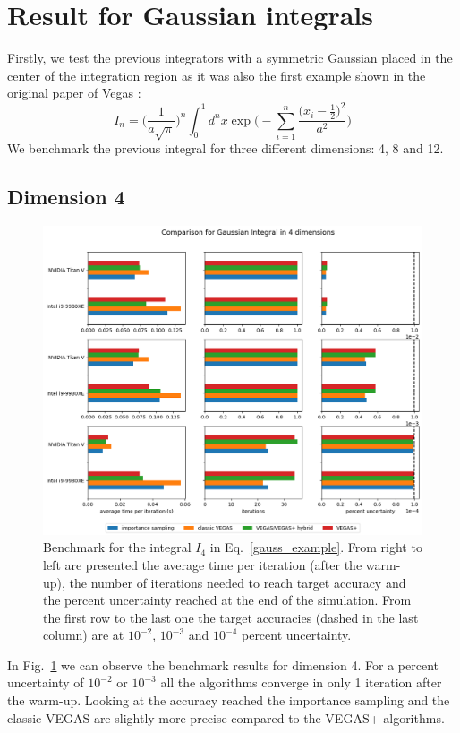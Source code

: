 \documentclass[../main/main.tex]{subfiles}
\begin{document}
\section{Result for Gaussian integrals}
Firstly, we test the previous integrators with a symmetric Gaussian placed in the center of the integration region as it was also the first 
example shown in the original paper of Vegas \cite{Lepage:1977sw}:
\begin{equation}
	\label{gauss_example}
	I_n = \bigg(\frac{1}{a \sqrt{\pi}}\bigg)^n \int_0^1 d^n x\exp{\bigg(-\sum_{i=1}^n \frac{\big( x_i - \frac{1}{2}\big)^2}{a^2}\bigg)}
\end{equation}
We benchmark the previous integral for three different dimensions: 4, 8 and 12.
\subsection{Dimension 4}

\begin{figure}
	\centering
	\includegraphics[width=\textwidth]{../images/gauss4d_final.png}
	\caption{Benchmark  for the integral $I_4$ in Eq.~\ref{gauss_example}. From right to left are presented the average time per iteration (after the warm-up), the number of iterations needed to reach target accuracy and the percent uncertainty reached at the end of the simulation. From the first row to the last one the target accuracies (dashed in the last column) are at $10^{-2}$, $10^{-3}$ and $10^{-4}$ percent uncertainty.}
	\label{gauss4d}
\end{figure}
In Fig.~\ref{gauss4d} we can observe the benchmark results for dimension 4.
For a percent uncertainty of $10^{-2}$  or $10^{-3}$ all the algorithms converge in only 1 iteration after the warm-up. Looking at the accuracy reached the importance sampling and the classic VEGAS  are slightly more precise compared to the VEGAS+ algorithms.
\end{document}
